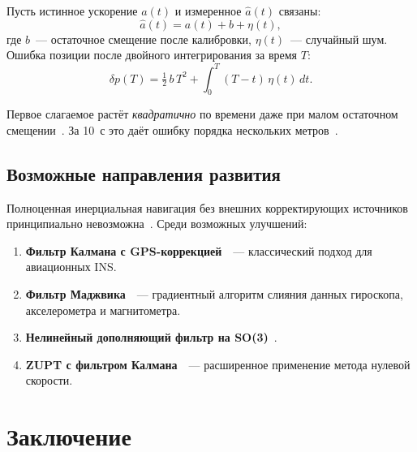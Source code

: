 Пусть истинное ускорение $a(t)$ и измеренное $\hat{a}(t)$ связаны:
\begin{equation}
    \hat{a}(t) = a(t) + b + \eta(t),
    \label{eq:noise}
\end{equation}
где $b$~--- остаточное смещение после калибровки, $\eta(t)$~--- случайный
шум. Ошибка позиции после двойного интегрирования за время $T$:
\begin{equation}
    \delta p(T) = \tfrac{1}{2}\,b\,T^2 +
    \int_0^T\!(T-t)\,\eta(t)\,dt.
    \label{eq:drift}
\end{equation}
 
Первое слагаемое растёт \textit{квадратично} по времени даже при малом
остаточном смещении~\cite{groves2013}. За 10~с это даёт ошибку порядка
нескольких метров~\cite{woodman2007}.
 
\subsection{Возможные направления развития}
 
Полноценная инерциальная навигация без внешних корректирующих источников
принципиально невозможна~\cite{groves2013}. Среди возможных улучшений:
\begin{enumerate}[leftmargin=2cm]
    \item \textbf{Фильтр Калмана с GPS-коррекцией}~\cite{groves2013}~---
          классический подход для авиационных INS.
    \item \textbf{Фильтр Маджвика}~\cite{madgwick2011}~--- градиентный
          алгоритм слияния данных гироскопа, акселерометра и магнитометра.
    \item \textbf{Нелинейный дополняющий фильтр на SO(3)}~\cite{mahony2008}.
    \item \textbf{ZUPT с фильтром Калмана}~\cite{skog2010}~---
          расширенное применение метода нулевой скорости.
\end{enumerate}
 
\newpage
 
\section*{Заключение}
 
